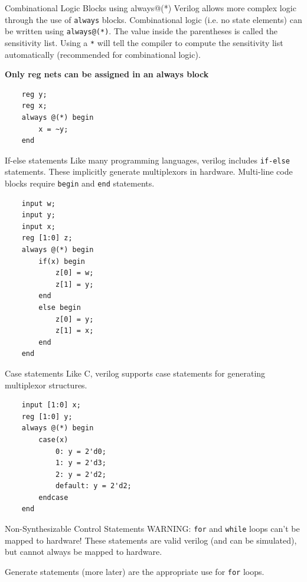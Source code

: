 \documentclass{beamer}
\begin{document}
\begin{frame}[fragile]{Combinational Logic Blocks using always@(*)}
	Verilog allows more complex logic through the use of \texttt{always} blocks.
	Combinational logic (i.e. no state elements) can be written using \texttt{always@(*)}.
	The value inside the parentheses is called the sensitivity list.
	Using a \texttt{*} will tell the compiler to compute the sensitivity list automatically (recommended for combinational logic).
	
	\textbf{Only reg nets can be assigned in an always block}

\begin{verbatim}
	reg y;
	reg x;
	always @(*) begin
		x = ~y;
	end
\end{verbatim}

\end{frame}

\begin{frame}[fragile]{If-else statements}
	Like many programming languages, verilog includes \texttt{if-else} statements.
	These implicitly generate multiplexors in hardware.
	Multi-line code blocks require \texttt{begin} and \texttt{end} statements.

\begin{verbatim}
	input w;
	input y;
	input x;
	reg [1:0] z;
	always @(*) begin
		if(x) begin
			z[0] = w;
			z[1] = y;
		end 
		else begin
			z[0] = y;
			z[1] = x;
		end
	end
\end{verbatim}

\end{frame}

\begin{frame}[fragile]{Case statements}
	Like C, verilog supports case statements for generating multiplexor structures.

\begin{verbatim}
	input [1:0] x;
	reg [1:0] y;
	always @(*) begin
		case(x)
			0: y = 2'd0;
			1: y = 2'd3;
			2: y = 2'd2;
			default: y = 2'd2;
		endcase
	end
\end{verbatim}

\end{frame}

\begin{frame}[fragile]{Non-Synthesizable Control Statements}
	WARNING: \texttt{for} and \texttt{while} loops can't be mapped to hardware!
	These statements are valid verilog (and can be simulated), but cannot always be mapped to hardware.
	
	
	Generate statements (more later) are the appropriate use for \texttt{for} loops.
\end{frame}
\end{document}
